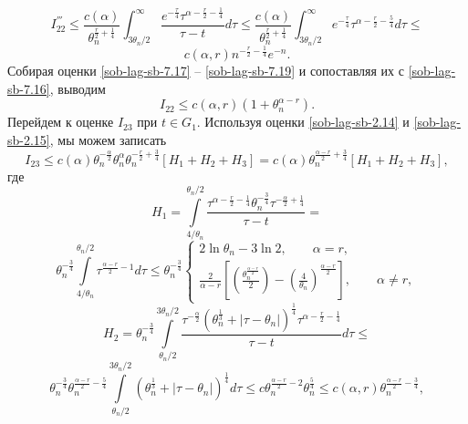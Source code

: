$$
I_{22}^{'''}\le \frac {c(\alpha)}{\theta_n^{\frac r 2 +\frac 1 4}}\int_{3\theta_n/2}^\infty \frac {e^{-\frac \tau 4}\tau^{\alpha-\frac r 2 - \frac 1 4}} {\tau -t} d\tau\le
 \frac {c(\alpha)}{\theta_n^{\frac r 2 +\frac 1 4}} \int_{3\theta_n/2}^\infty e^{-\frac \tau 4}\tau^{\alpha-\frac r 2 - \frac 5 4} d\tau \le
$$
\begin{equation}\label{sob-lag-sb-7.19}
c(\alpha,r)n^{-\frac r 2- \frac 1 4}e^{-n}.
\end{equation}
Собирая оценки \eqref{sob-lag-sb-7.17} -- \eqref{sob-lag-sb-7.19} и сопоставляя их с \eqref{sob-lag-sb-7.16}, выводим
\begin{equation}\label{sob-lag-sb-7.20}
I_{22}\le c(\alpha, r)(1+\theta _n^{\alpha - r}).
\end{equation}
Перейдем к оценке $I_{23}$ при $t\in G_{1}$. Используя оценки \eqref{sob-lag-sb-2.14} и \eqref{sob-lag-sb-2.15}, мы можем записать
\begin{equation}\label{sob-lag-sb-7.21}
I_{23}\le c(\alpha)\theta_n^{-\frac \alpha 2}\theta_n^\alpha\theta_n^{-\frac r 2+\frac 3 4}[H_1+H_2+H_3]=c(\alpha)\theta_n^{\frac {\alpha-r} 2 +\frac 3 4 }[H_1+H_2+H_3],
\end{equation}
где
$$
H_1=\int\limits_{4/\theta_n}^{\theta_n/2}\frac{\tau^{\alpha-\frac r 2 -\frac 14} \theta_n^{- \frac 3 4}\tau^{-\frac \alpha 2+ \frac 1 4}} {\tau-t}=
$$
\begin{equation}\label{sob-lag-sb-7.22}
    \theta_n^{-\frac 3 4}\int\limits_{4/\theta _n}^{\theta_n/2}\tau^{\frac {\alpha-r} 2 -1}d\tau\le \theta_n^{-\frac 3 4}
    \left\{
    \begin{aligned}
        2\ln \theta_n -3\ln 2,\qquad \alpha =r,\\
        \frac 2{\alpha -r}\left[\left(\frac {\theta_n^\frac {\alpha-r} 2} 2\right)- \left(\frac 4 {\theta_n}\right)^\frac {\alpha -r}2\right], \qquad \alpha \not=r,
    \end{aligned}
        \right.
\end{equation}
$$
H_2=\theta_n^{-\frac 3 4}\int\limits_{\theta_n/2}^{3\theta_n/2}\frac{\tau^{-\frac \alpha 2}(\theta_n^{\frac 1 3}+|\tau-\theta_n|)^{\frac 1 4}\tau^{\alpha - \frac r 2 - \frac 1 4}}{\tau-t}d\tau \le
$$
\begin{equation}\label {7.23}
\theta_n^{-\frac 3 4}\theta_n^{\frac {\alpha-r}2-\frac 5 4}\int\limits_{\theta_n/2}^{3\theta_n/2}(\theta_n^\frac 1 3+|\tau-\theta_n|)^{\frac 1 4}d
\tau\le c\theta_n^{\frac {\alpha - r} 2-2}\theta_n^{\frac 5 4}\le c(\alpha, r)\theta_n^{\frac {\alpha - r} 2 - \frac 3 4},
\end{equation}
